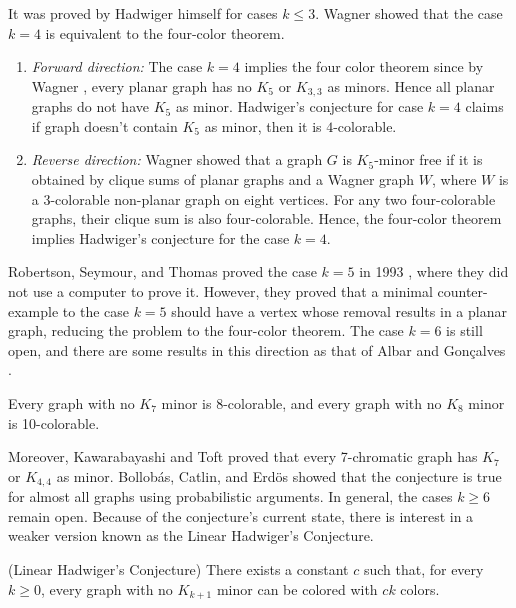 It was proved by Hadwiger himself for cases $k \leq 3$. Wagner \cite{wagner_1937} showed that the case $k = 4$ is equivalent to the four-color theorem.
\begin{enumerate}
    \item \textit{Forward direction:} The case $k = 4$ implies the four color theorem since by Wagner \cite{wagner_1937}, every planar graph has no $K_5$ or $K_{3, 3}$ as 
 minors. Hence all planar graphs do not have $K_5$ as minor. Hadwiger's conjecture for case $k = 4$ claims if graph doesn't contain
    $K_5$ as minor, then it is $4$-colorable.
    \item \textit{Reverse direction:} Wagner \cite{wagner_1937} showed that a graph $G$ is $K_5$-minor free if it is obtained by 
clique sums of planar graphs and a Wagner graph $W$, where $W$ is a 3-colorable non-planar graph on eight vertices.
For any two four-colorable graphs, their clique sum is also four-colorable. Hence, the four-color theorem implies Hadwiger's conjecture
for the case $k = 4$.
\end{enumerate}

Robertson, Seymour, and Thomas proved the case $k = 5$ in 1993 \cite{robertson_seymour_1993}, 
where they did not use a computer to prove it. However, they proved that a minimal counter-example to the case $k = 5$ should have 
a vertex whose removal results in a planar graph, reducing the problem to the four-color theorem. The case $k = 6$ is still open, and there are some results in this direction as that of Albar and Gonçalves \cite{albar_goncalves_2013}. 
\begin{thm}
 Every graph with no $K_7$ minor is 8-colorable, and every graph with no $K_8$ minor is 10-colorable.
\end{thm}

Moreover, Kawarabayashi and Toft \cite{Kawarabayashi2005} proved that every 7-chromatic graph has $K_7$ or $K_{4,4}$ as minor.
Bollobás, Catlin, and Erdös \cite{BOLLOBAS1980195} showed that the conjecture is true for almost all graphs using
probabilistic arguments. In general, the cases $k \geq 6$ remain open.
Because of the conjecture's current state, there is interest in a weaker version known as the Linear Hadwiger's Conjecture.

\begin{conj} (Linear Hadwiger's Conjecture)
 There exists a constant $c$ such that, for every $k \geq 0$, every graph with no $K_{k+1}$ minor can be colored with $ck$ colors.
\end{conj}

